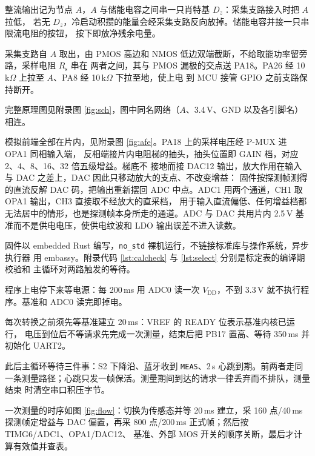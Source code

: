 \documentclass[12pt,a4paper]{article}
\newcommand{\subheading}[1]{%
  \par\vspace{2pt}\noindent{\fontsize{14bp}{22bp}\selectfont\bfseries #1}\par}
\begin{document}
整流输出记为节点 $A$，$A$ 与储能电容之间串一只肖特基 $D_z$：采集支路接入时把 $A$ 拉低，
若无 $D_z$，冷启动积攒的能量会经采集支路反向放掉。储能电容并接一只串限流电阻的按钮，
按下即放净残余电量。

采集支路自 $A$ 取出，由 PMOS 高边和 NMOS 低边双端截断，不给取能功率留旁路，采样电阻 $R_{\mathrm{s}}$ 串在
两者之间，其与 PMOS 漏极的交点送 PA18。PA26 经 10\,k$\Omega$ 上拉至 $A$、PA8 经 10\,k$\Omega$ 下拉至地，使上电
到 MCU 接管 GPIO 之前支路保持断开。

完整原理图见附录图 \ref{fig:sch}，图中同名网络（$A$、3.4\,V、GND 以及各引脚名）相连。


模拟前端全部在片内，见附录图 \ref{fig:afe}。PA18 上的采样电压经 P-MUX 进 OPA1 同相输入端，
反相端接片内电阻梯的抽头，抽头位置即 GAIN 档，对应 2、4、8、16、32 倍五级增益。梯底不
接地而接 DAC12 输出，放大作用在输入与 DAC 之差上，DAC 因此只移动放大的支点、不改变增益：
固件按探测帧测得的直流反解 DAC 码，把输出重新摆回 ADC
中点。ADC1 用两个通道，CH1 取 OPA1 输出，CH3 直接取不经放大的直采档，
用于输入直流偏低、任何增益档都无法居中的情形，也是探测帧本身所走的通道。ADC 与 DAC
共用片内 2.5\,V 基准而不是供电电压，使供电纹波和 LDO 输出误差不进入读数。


\subheading{2．软件设计}

固件以 embedded Rust 编写，\texttt{no\_std} 裸机运行，不链接标准库与操作系统，异步执行器
用 embassy。附录代码 \ref{lst:calcheck} 与 \ref{lst:select} 分别是标定表的编译期校验和
主循环对两路触发的等待。

程序上电停下来等电源：每 200\,ms 用 ADC0 读一次 $V_{\mathrm{DD}}$，不到
3.3\,V 就不执行程序。基准和 ADC0 读完即掉电。

每次转换之前须先等基准建立 20\,ms：VREF 的 READY 位表示基准内核已运行，
电压到位后不等请求先完成一次测量，结束后把 PB17 置高、等待 350\,ms 并初始化 UART2。

此后主循环等待三件事：S2 下降沿、蓝牙收到 \texttt{MEAS}、2\,s 心跳到期。前两者走同一条测量路径；心跳只发一帧保活。测量期间到达的请求一律丢弃而不排队，测量结束
时清空串口积压字节。

一次测量的时序如图 \ref{fig:flow}：切换为传感态并等 20\,ms 建立，采 160 点/40\,ms
探测帧定增益与 DAC 偏置，再采 800 点/200\,ms 正式帧；然后按 TIMG6/ADC1、OPA1/DAC12、
基准、外部 MOS 开关的顺序关断，最后才计算有效值并查表。
\end{document}
